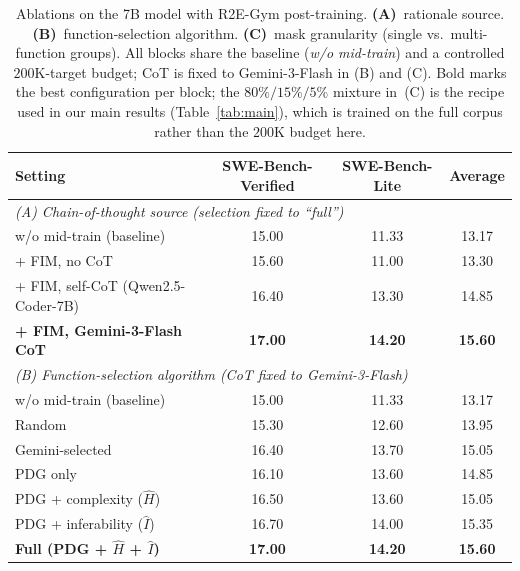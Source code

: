 \begin{table}[t]
\centering
\caption{Ablations on the 7B model with R2E-Gym post-training.
\textbf{(A)}~rationale source. \textbf{(B)}~function-selection algorithm.
\textbf{(C)}~mask granularity (single vs.\ multi-function groups).
All blocks share the baseline (\emph{w/o mid-train}) and a controlled
$200$K-target budget; CoT is fixed to Gemini-3-Flash in (B) and (C).
Bold marks the best configuration per block; the $80\%/15\%/5\%$ mixture
in~(C) is the recipe used in our main results (Table~\ref{tab:main}),
which is trained on the full corpus rather than the $200$K budget here.}
\label{tab:ablation}
\small
\setlength{\tabcolsep}{8pt}
\begin{tabular}{lccc}
\toprule
Setting & SWE-Bench-Verified & SWE-Bench-Lite & Average \\
\midrule
\multicolumn{4}{l}{\emph{(A) Chain-of-thought source (selection fixed to ``full'')}} \\
\midrule
w/o mid-train (baseline)                  & 15.00 & 11.33 & 13.17 \\
+ FIM, no CoT                             & 15.60 & 11.00 & 13.30 \\
+ FIM, self-CoT (Qwen2.5-Coder-7B)        & 16.40 & 13.30 & 14.85 \\
\textbf{+ FIM, Gemini-3-Flash CoT}        & \textbf{17.00} & \textbf{14.20} & \textbf{15.60} \\
\midrule
\multicolumn{4}{l}{\emph{(B) Function-selection algorithm (CoT fixed to Gemini-3-Flash)}} \\
\midrule
w/o mid-train (baseline)                    & 15.00 & 11.33 & 13.17 \\
Random                                      & 15.30 & 12.60 & 13.95 \\
Gemini-selected                             & 16.40 & 13.70 & 15.05 \\
PDG only                                    & 16.10 & 13.60 & 14.85 \\
PDG + complexity ($\hat{H}$)                & 16.50 & 13.60 & 15.05 \\
PDG + inferability ($\hat{I}$)              & 16.70 & 14.00 & 15.35 \\
\textbf{Full (PDG + $\hat{H}$ + $\hat{I}$)} & \textbf{17.00} & \textbf{14.20} & \textbf{15.60} \\

\end{tabular}
\end{table}
